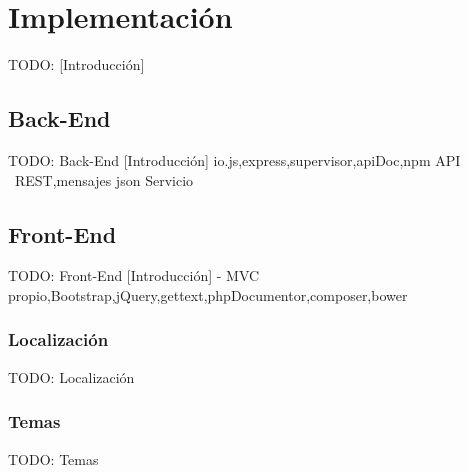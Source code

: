 \chapter{Implementación\label{cap:implementacion}}

TODO: [Introducción]


\section{Back-End\label{sec:imp:back_end}}

TODO: Back-End
  [Introducción]
  {io.js,express,supervisor,apiDoc,npm}
  {API ~REST,mensajes json}
  {Servicio}


\section{Front-End\label{sec:imp:front_end}}

TODO: Front-End
  [Introducción]
  - {MVC propio,Bootstrap,jQuery,gettext,phpDocumentor,composer,bower}


\subsection{Localización\label{ssec:imp:localizacion}}

TODO: Localización


\subsection{Temas\label{ssec:imp:temas}}

TODO: Temas